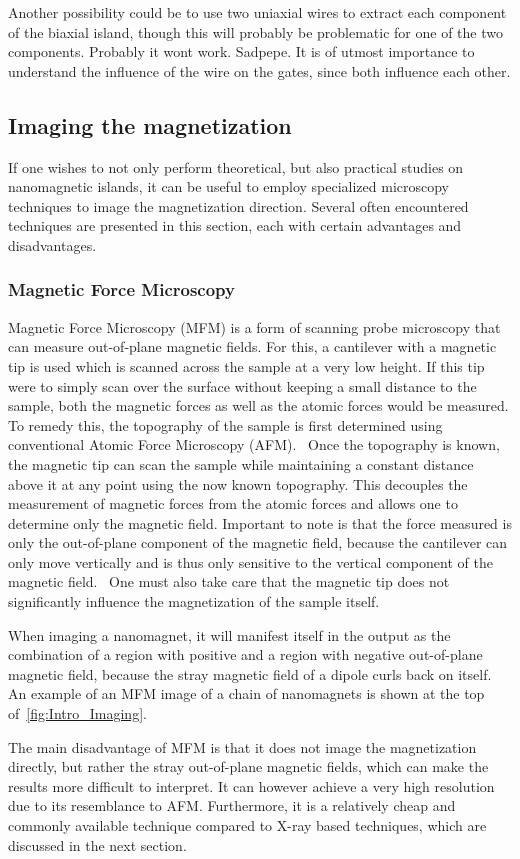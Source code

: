 \documentclass[12pt,a4paper]{article}
\begin{document}
Another possibility could be to use two uniaxial wires to extract each component of the biaxial island, though this will probably be problematic for one of the two components. Probably it wont work. Sadpepe.
It is of utmost importance to understand the influence of the wire on the gates, since both influence each other.

\FloatBarrier
\subsection{Imaging the magnetization}
If one wishes to not only perform theoretical, but also practical studies on nanomagnetic islands, it can be useful to employ specialized microscopy techniques to image the magnetization direction. Several often encountered techniques are presented in this section, each with certain advantages and disadvantages.

\subsubsection{Magnetic Force Microscopy}
Magnetic Force Microscopy (MFM) is a form of scanning probe microscopy that can measure out-of-plane magnetic fields. For this, a cantilever with a magnetic tip is used which is scanned across the sample at a very low height. If this tip were to simply scan over the surface without keeping a small distance to the sample, both the magnetic forces as well as the atomic forces would be measured. To remedy this, the topography of the sample is first determined using conventional Atomic Force Microscopy (AFM).~\cite{NML_Carlton, PEEM} Once the topography is known, the magnetic tip can scan the sample while maintaining a constant distance above it at any point using the now known topography. This decouples the measurement of magnetic forces from the atomic forces and allows one to determine only the magnetic field. Important to note is that the force measured is only the out-of-plane component of the magnetic field, because the cantilever can only move vertically and is thus only sensitive to the vertical component of the magnetic field.~\cite{NML_Carlton} One must also take care that the magnetic tip does not significantly influence the magnetization of the sample itself.~\cite{Probing_MagnetoOptics} \par
When imaging a nanomagnet, it will manifest itself in the output as the combination of a region with positive and a region with negative out-of-plane magnetic field, because the stray magnetic field of a dipole curls back on itself.~\cite{NML_Carlton} An example of an MFM image of a chain of nanomagnets is shown at the top of~\cref{fig:Intro_Imaging}. \par
The main disadvantage of MFM is that it does not image the magnetization directly, but rather the stray out-of-plane magnetic fields, which can make the results more difficult to interpret. It can however achieve a very high resolution due to its resemblance to AFM. Furthermore, it is a relatively cheap and commonly available technique compared to X-ray based techniques, which are discussed in the next section.
\end{document}
